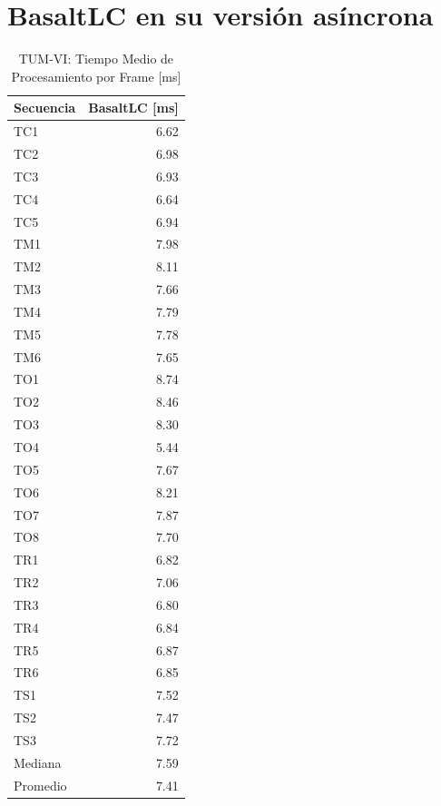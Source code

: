 \chapter{BasaltLC en su versión asíncrona}
\label{sec:basaltlc_async_times}

\begin{table}[!htbp]
\centering
\caption{TUM-VI: Tiempo Medio de Procesamiento por Frame [ms]}
\label{tab:tumvi_mean_frame_time}
\begin{tabular}{lr}
\toprule
\textbf{Secuencia} & \textbf{BasaltLC} [ms] \\
\midrule
TC1 & 6.62 \\
TC2 & 6.98 \\
TC3 & 6.93 \\
TC4 & 6.64 \\
TC5 & 6.94 \\
\midrule
TM1 & 7.98 \\
TM2 & 8.11 \\
TM3 & 7.66 \\
TM4 & 7.79 \\
TM5 & 7.78 \\
TM6 & 7.65 \\
\midrule
TO1 & 8.74 \\
TO2 & 8.46 \\
TO3 & 8.30 \\
TO4 & 5.44 \\
TO5 & 7.67 \\
TO6 & 8.21 \\
TO7 & 7.87 \\
TO8 & 7.70 \\
\midrule
TR1 & 6.82 \\
TR2 & 7.06 \\
TR3 & 6.80 \\
TR4 & 6.84 \\
TR5 & 6.87 \\
TR6 & 6.85 \\
\midrule
TS1 & 7.52 \\
TS2 & 7.47 \\
TS3 & 7.72 \\
\midrule
Mediana & 7.59 \\
Promedio   & 7.41 \\
\bottomrule
\end{tabular}
\end{table}

